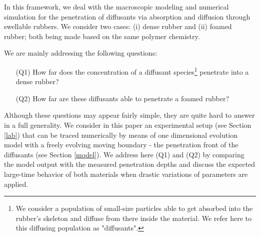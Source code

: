 \documentclass{article}
\begin{document}
In this framework, we deal with  the macroscopic modeling and numerical simulation for the penetration of diffusants via absorption and diffusion through swellable rubbers. We consider two cases: (i) dense rubber and (ii) foamed rubber; both being made based on the same polymer chemistry. 

We are mainly addressing the following questions:
\begin{itemize}
\item[(Q1)] How far does the concentration of a diffusant species\footnote{We consider a population of small-size particles able to get absorbed into the rubber's skeleton and diffuse from there inside the material. We refer here to this diffusing population as "diffusants".} penetrate into a  dense rubber?
\item[(Q2)] How far are these diffusants able to penetrate a foamed rubber?
\end{itemize}
Although these questions may appear fairly simple, they are quite hard to answer in a full generality. We consider in this paper an experimental setup (see Section \ref{lab}) that can be traced numerically by means of one dimensional evolution model with a freely evolving moving boundary - the penetration front of the diffusants (see Section \ref{model}). We address here  (Q1) and (Q2)  by comparing the model output with the measured penetration depths and discuss the expected large-time behavior of both materials when drastic variations of parameters are applied. 
\end{document}
